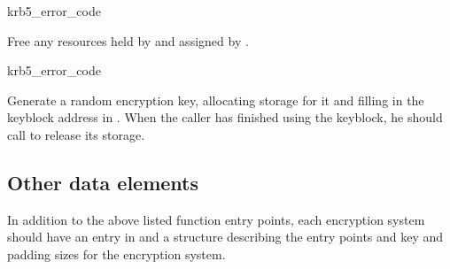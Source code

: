 \begin{funcdecl}{krb5_error_code}{\funcvoid}
\end{funcdecl}
Free any resources held by  and assigned by
. 

\begin{funcdecl}{krb5_error_code}{\funcvoid}
\end{funcdecl}
Generate a random encryption key, allocating storage for it and
filling in the keyblock address in .
When the caller has finished using the keyblock, he should call
 to release its storage.

\subsection{Other data elements}
In addition to the above listed function entry points, each encryption
system should have an entry in  and a
 structure describing the entry points
and key and padding sizes for the encryption system.
